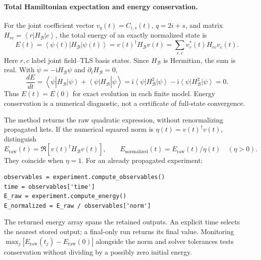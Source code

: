\documentclass[11pt,a4paper]{article}
\newcommand{\ket}[1]{\left|#1\right\rangle}
\newcommand{\bra}[1]{\left\langle#1\right|}
\newcommand{\ii}{\mathrm{i}}
\newcommand{\code}[1]{\texttt{\detokenize{#1}}}
\newcommand{\B}{\mathcal B}
\begin{document}
\paragraph{Total Hamiltonian expectation and energy conservation.}
For the joint coefficient vector $v_q(t)=C_{i,s}(t)$, $q=2i+s$, and matrix
$H_{rc}=\bra rH_\B\ket c$, the total energy of an exactly normalized state is
\begin{equation}
 E(t)=\bra{\psi(t)}H_\B\ket{\psi(t)}
     =v(t)^\dagger H_{\B}v(t)
     =\sum_{r,c}v_r^*(t)H_{rc}v_c(t).
 \label{eq:total-energy}
\end{equation}
Here $r,c$ label joint field--TLS basis states. Since $H_\B$ is Hermitian,
the sum is real. With $\dot\psi=-\ii H_\B\psi$ and $\partial_tH_\B=0$,
\begin{equation}
 \frac{dE}{dt}
 =\bra{\dot\psi}H_\B\ket\psi+\bra\psi H_\B\ket{\dot\psi}
 =\ii\bra\psi H_\B^2\ket\psi-\ii\bra\psi H_\B^2\ket\psi=0.
 \label{eq:total-energy-conservation}
\end{equation}
Thus $E(t)=E(0)$ for exact evolution in each finite model. Energy conservation
is a numerical diagnostic, not a certificate of full-state convergence.

The method \code{compute_energy} returns the raw quadratic expression, without
renormalizing propagated kets. If the numerical squared norm is
$\eta(t)=v(t)^\dagger v(t)$, distinguish
\begin{equation}
 E_{\mathrm{raw}}(t)=\Re[v(t)^\dagger H_{\B}v(t)],\qquad
 E_{\mathrm{normalized}}(t)=E_{\mathrm{raw}}(t)/\eta(t)\quad(\eta>0).
\end{equation}
They coincide when $\eta=1$. For an already propagated experiment:
\begin{lstlisting}
observables = experiment.compute_observables()
time = observables['time']
E_raw = experiment.compute_energy()
E_normalized = E_raw / observables['norm']
\end{lstlisting}
The returned energy array spans the retained outputs. An explicit time selects
the nearest stored output; a final-only run returns its final value. Monitoring
$\max_j|E_{\mathrm{raw}}(t_j)-E_{\mathrm{raw}}(0)|$ alongside the norm and solver
tolerances tests conservation without dividing by a possibly zero initial energy.
\end{document}
